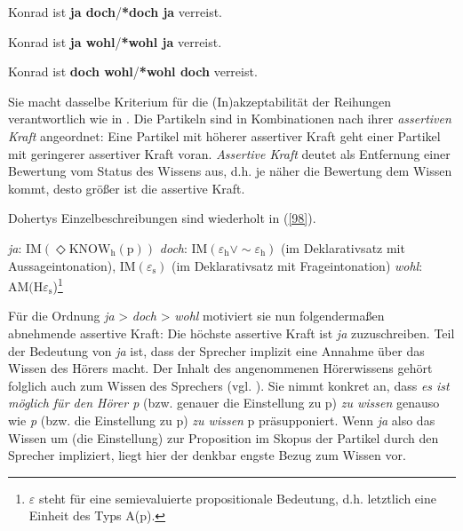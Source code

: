 \begin{exe}
	\ex\label{95} 
	Konrad ist \textbf{ja doch}/\textbf{*doch ja} verreist.
\end{exe}
\vspace{-0.65cm}
\begin{exe}
	\ex\label{96} 
	Konrad ist \textbf{ja wohl}/\textbf{*wohl ja} verreist.
\end{exe}
\vspace{-0.65cm}
\begin{exe}
	\ex\label{97} 
	Konrad ist \textbf{doch wohl}/\textbf{*wohl doch }verreist.
			\hfill\hbox {\citet[114]{Doherty1987}}
\end{exe}
Sie macht dasselbe Kriterium für die (In)akzeptabilität der Reihungen verantwortlich wie in \citet{Doherty1985}. Die Partikeln sind in Kombinationen nach ihrer \textit{assertiven Kraft}  angeordnet: Eine Partikel mit höherer assertiver Kraft geht einer Partikel mit geringerer assertiver Kraft voran. \textit{Assertive Kraft} deutet \citet{Doherty1987} als Entfernung einer Bewertung vom Status des Wissens aus, d.h. je näher die Bewertung dem Wissen kommt, desto größer ist die assertive Kraft.

Dohertys Einzelbeschreibungen sind wiederholt in (\ref{98}).
\begin{exe}
	\ex\label{98} 
		\begin{xlist}	
			\ex\label{98a} \textit{ja}: $\textrm{IM}(\Diamond \textrm{KNOW}_{\textrm{h}}(\textrm{p}))$
			\ex\label{98b} \textit{doch}: $\textrm{IM}(\varepsilon_{\textrm{h}} \lor \sim\varepsilon_{\textrm{h}})$ (im Deklarativsatz mit Aussageintonation), IM$(\varepsilon_{\textrm{s}})$ (im Deklarativsatz mit Frageintonation)
			\ex\label{98c} \textit{wohl}: $\textrm{AM(H}\varepsilon_{\textrm{s}}$)\footnote{$\varepsilon$ steht für eine semievaluierte propositionale Bedeutung, d.h. 																			letztlich eine Einheit des Typs A(p).}			
		\end{xlist}
\end{exe}
Für die Ordnung \textit{ja} > \textit{doch} > \textit{wohl} motiviert sie nun folgendermaßen abnehmende assertive Kraft: Die höchste assertive Kraft ist \textit{ja} zuzuschreiben. Teil der Bedeutung von \textit{ja} ist, dass der Sprecher implizit eine Annahme über das Wissen des Hörers macht. Der Inhalt des angenommenen Hörerwissens gehört folglich auch zum Wissen des Sprechers (vgl. \citealt[103]{Doherty1987}). Sie nimmt konkret an, dass \textit{es ist möglich für den Hörer p} (bzw. genauer die Einstellung zu p) \textit{zu wissen} genauso wie \textit{p} (bzw. die Einstellung zu p) \textit{zu wissen} p präsupponiert. Wenn \textit{ja} also das Wissen um (die Einstellung) zur Proposition im Skopus der Partikel durch den Sprecher impliziert, liegt hier der denkbar engste Bezug zum Wissen vor. 


